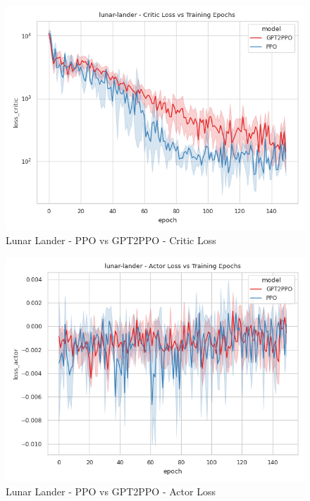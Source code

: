 \documentclass[conference]{IEEEtran}
\begin{document}
\begin{figure}[htbp]
    \centerline{\includegraphics[width=\columnwidth]{./img/lunar-lander-loss_critic-model.png}}
    \caption{Lunar Lander - PPO vs GPT2PPO - Critic Loss}
    \label{lunar-lander-loss_critic-model}
\end{figure}
\begin{figure}[htbp]
    \centerline{\includegraphics[width=\columnwidth]{./img/lunar-lander-loss_actor-model.png}}
    \caption{Lunar Lander - PPO vs GPT2PPO - Actor Loss}
    \label{lunar-lander-loss_actor-model}
\end{figure}
\end{document}
